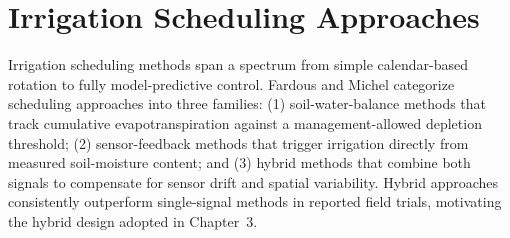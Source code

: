 \section{Irrigation Scheduling Approaches}
Irrigation scheduling methods span a spectrum from simple calendar-based rotation to fully
model-predictive control. Fardous and Michel \cite{fardous2022} categorize scheduling approaches into three
families: (1) soil-water-balance methods that track cumulative evapotranspiration against a
management-allowed depletion threshold; (2) sensor-feedback methods that trigger irrigation
directly from measured soil-moisture content; and (3) hybrid methods that combine both
signals to compensate for sensor drift and spatial variability. Hybrid approaches
consistently outperform single-signal methods in reported field trials, motivating the
hybrid design adopted in Chapter~3.
